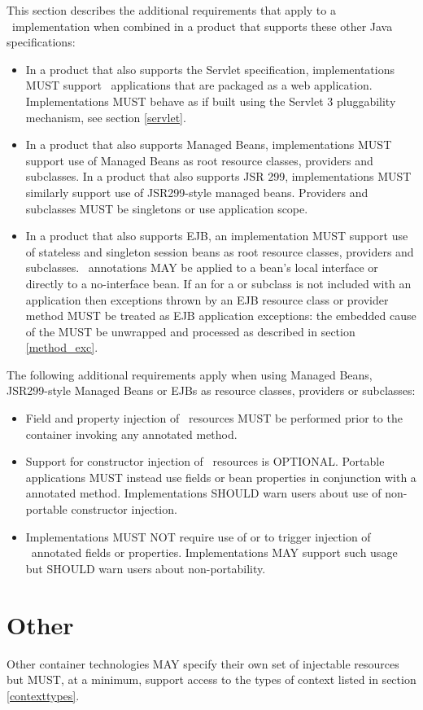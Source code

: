 This section describes the additional requirements that apply to a \jaxrs\ implementation when combined in a product that supports these other Java specifications:

\begin{itemize}
\item In a product that also supports the Servlet specification, implementations MUST support \jaxrs\ applications that are packaged as a web application. Implementations MUST behave as if built using the Servlet 3 pluggability mechanism, see section \ref{servlet}.
\item In a product that also supports Managed Beans, implementations MUST support use of Managed Beans as root resource classes, providers and  subclasses. In a product that also supports JSR 299, implementations MUST similarly support use of JSR299-style managed beans. Providers and  subclasses MUST be singletons or use application scope.
\item In a product that also supports EJB, an implementation MUST support use of stateless and singleton session beans as root resource classes, providers and  subclasses. \jaxrs\ annotations MAY be applied to a bean's local interface or directly to a no-interface bean. If an  for a  or subclass is not included with an application then exceptions thrown by an EJB resource class or provider method MUST be treated as EJB application exceptions: the embedded cause of the  MUST be unwrapped and processed as described in section \ref{method_exc}.
\end{itemize}

The following additional requirements apply when using Managed Beans, JSR299-style Managed Beans or EJBs as resource classes, providers or  subclasses:

\begin{itemize}
\item Field and property injection of \jaxrs\ resources MUST be performed prior to the container invoking any  annotated method.
\item Support for constructor injection of \jaxrs\ resources is OPTIONAL. Portable applications MUST instead use fields or bean properties in conjunction with a  annotated method. Implementations SHOULD warn users about use of non-portable constructor injection.
\item Implementations MUST NOT require use of  or  to trigger injection of \jaxrs\ annotated fields or properties. Implementations MAY support such usage but SHOULD warn users about non-portability.
\end{itemize}

\section{Other}

Other container technologies MAY specify their own set of injectable resources but MUST, at a minimum, support access to the types of context listed in section \ref{contexttypes}.